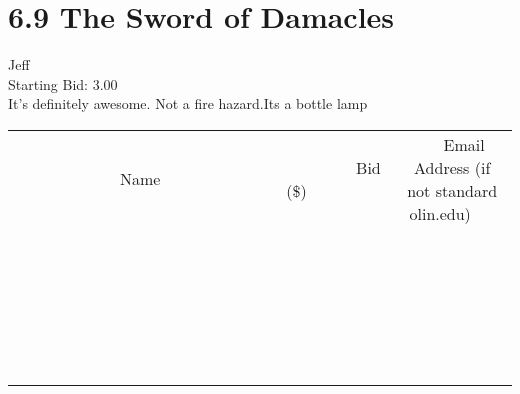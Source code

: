 \documentclass[11pt]{article}
\begin{document}
					\section*{6.9 The Sword of Damacles}
					Jeff \\
					Starting Bid: 3.00 \\
					It's definitely awesome. Not a fire hazard.Its a bottle lamp \\
					[6ex]
					\begin{tabular}{c c c}
						~~~~~~~~~~~~~Name~~~~~~~~~~~~~ & ~~~~~~~~~Bid (\$)~~~~~~~~~ & ~~~Email Address (if not standard olin.edu)~~~ \\
				
 & & \\
\hline
 & & \\
\hline
 & & \\
\hline
 & & \\
\hline
 & & \\
\hline
 & & \\
\hline
 & & \\
\hline
 & & \\
\hline
 & & \\
\hline
 & & \\
\hline
 & & \\
\hline
 & & \\
\hline
 & & \\
\hline
 & & \\
\hline
 & & \\
\hline
 & & \\
\hline
 & & \\
\hline
 & & \\
\hline
 & & \\
\hline
 & & \\
\hline
 & & \\
\hline
 & & \\
\hline
 & & \\
\hline
 & & \\
\hline
 & & \\
\hline
 & & \\
\hline
					\end{tabular}
					\clearpage
				
\end{document}
